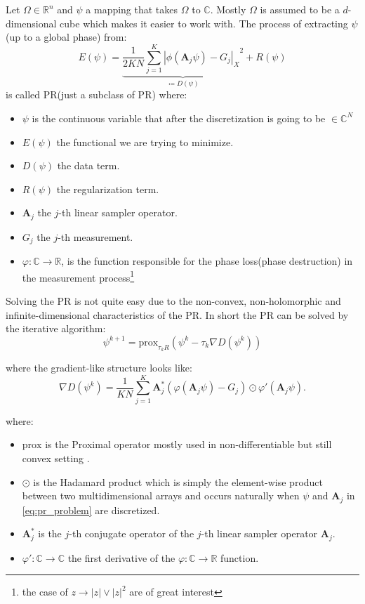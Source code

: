 Let $\Omega \in \mathbb{R}^n$ and $\psi$ a mapping that takes $\Omega$ to $\mathbb{C}$. Mostly $\Omega$ is assumed to be a 
$d$-dimensional cube which makes it easier to work with. The process of extracting $\psi$(up to a global phase) from:
\begin{equation}\label{eq:pr_problem}
	E(\psi) = \underbrace{\frac{1}{2KN} \sum_{j=1}^{K} {\left|\phi(\boldsymbol{A}_j\psi)-G_j\right|_X}^2}_{\coloneqq D(\psi)}+ R(\psi)
  \end{equation}
  is called \acl*{PR}(just a subclass of \acl*{PR}) where:
  \begin{itemize}
  \item $\psi$ is the continuous variable that after the discretization is going to be $\in \mathbb{C}^N$
	\item $E(\psi)$ the functional we are trying to minimize.
	\item $D(\psi)$ the data term.
	\item $R(\psi)$ the regularization term.
	\item $\boldsymbol{A}_j$ the $j$-th linear sampler operator.
	\item $G_j$ the $j$-th measurement.
	\item $\varphi \colon \mathbb{C} \rightarrow \mathbb{R}$, 
	is the function responsible for the phase loss(phase destruction) in the measurement process\footnote{the case of $z \rightarrow \left|z\right| \lor {\left|z\right|^2}$ are of great interest}
  \end{itemize}

Solving the \acl*{PR} is not quite easy due to the non-convex, non-holomorphic and infinite-dimensional characteristics of the \acl*{PR}. 
In short the \acl*{PR} can be solved by the iterative algorithm:
  \begin{equation}\label{eq:pr_solution}
	\psi^{k+1} = \text{prox}_{\tau_{k}R}(\psi^k-\tau_k\nabla{D(\psi^k)})
  \end{equation}

  where the gradient-like structure looks like: 
  \begin{equation}\label{eq:gradient_pr_solution}
	\nabla{D(\psi^k)} = \frac{1}{KN} \sum_{j=1}^{K} \boldsymbol{A}_j^*\left(\varphi\left(\boldsymbol{A}_j\psi\right)-G_j\right)\odot \varphi'(\boldsymbol{A}_j\psi).
  \end{equation}

  where:
  \begin{itemize}
	\item $\mathrm{prox}$ is the Proximal operator mostly used in non-differentiable but still convex setting \cite{Bredies2018}.
	\item $\odot$ is the Hadamard product\cite{Hackbusch2019} which is simply the element-wise product between two multidimensional arrays and occurs naturally when $\psi$ and $\boldsymbol{A}_j$ in \cref{eq:pr_problem} are discretized.
	\item $\boldsymbol{A}^*_j$ is the $j$-th conjugate operator of the $j$-th linear sampler operator $\boldsymbol{A}_j$.
	\item $\varphi' \colon \mathbb{C} \to \mathbb{C}$ the first derivative of the $\varphi \colon \mathbb{C} \to \mathbb{R}$ function.
  \end{itemize}

